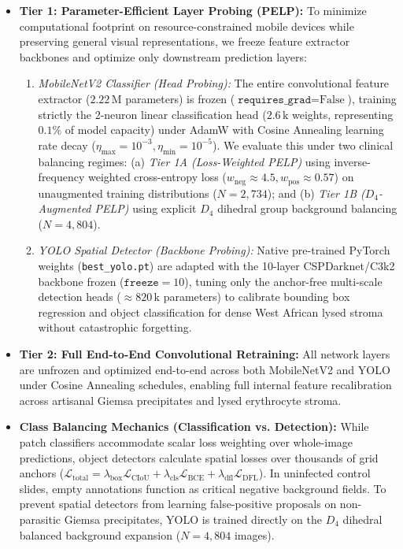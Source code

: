 \documentclass[a4paper,11pt]{article}
\begin{document}
\begin{itemize}\itemsep2pt
    \item \textbf{Tier 1: Parameter-Efficient Layer Probing (PELP):} 
    To minimize computational footprint on resource-constrained mobile devices while preserving general visual representations, we freeze feature extractor backbones and optimize only downstream prediction layers:
    \begin{enumerate}
        \item \textit{MobileNetV2 Classifier (Head Probing):} The entire convolutional feature extractor ($2.22\,\text{M}$ parameters) is frozen ($\texttt{requires\_grad}=\text{False}$), training strictly the 2-neuron linear classification head ($2.6\,\text{k}$ weights, representing $0.1\%$ of model capacity) under AdamW with Cosine Annealing learning rate decay ($\eta_{\max} = 10^{-3}, \eta_{\min} = 10^{-5}$). We evaluate this under two clinical balancing regimes: (a) \textit{Tier 1A (Loss-Weighted PELP)} using inverse-frequency weighted cross-entropy loss ($w_{\text{neg}} \approx 4.5, w_{\text{pos}} \approx 0.57$) on unaugmented training distributions ($N = 2,734$); and (b) \textit{Tier 1B ($D_4$-Augmented PELP)} using explicit $D_4$ dihedral group background balancing ($N = 4,804$).
        \item \textit{YOLO Spatial Detector (Backbone Probing):} Native pre-trained PyTorch weights (\texttt{best\_yolo.pt}) are adapted with the 10-layer CSPDarknet/C3k2 backbone frozen ($\texttt{freeze}=10$), tuning only the anchor-free multi-scale detection heads ($\approx 820\,\text{k}$ parameters) to calibrate bounding box regression and object classification for dense West African lysed stroma without catastrophic forgetting.
    \end{enumerate}
    \item \textbf{Tier 2: Full End-to-End Convolutional Retraining:}
    All network layers are unfrozen and optimized end-to-end across both MobileNetV2 and YOLO under Cosine Annealing schedules, enabling full internal feature recalibration across artisanal Giemsa precipitates and lysed erythrocyte stroma.
    \item \textbf{Class Balancing Mechanics (Classification vs. Detection):}
    While patch classifiers accommodate scalar loss weighting over whole-image predictions, object detectors calculate spatial losses over thousands of grid anchors ($\mathcal{L}_{\text{total}} = \lambda_{\text{box}}\mathcal{L}_{\text{CIoU}} + \lambda_{\text{cls}}\mathcal{L}_{\text{BCE}} + \lambda_{\text{dfl}}\mathcal{L}_{\text{DFL}}$). In uninfected control slides, empty annotations function as critical negative background fields. To prevent spatial detectors from learning false-positive proposals on non-parasitic Giemsa precipitates, YOLO is trained directly on the $D_4$ dihedral balanced background expansion ($N = 4,804$ images).
\end{itemize}
\end{document}
